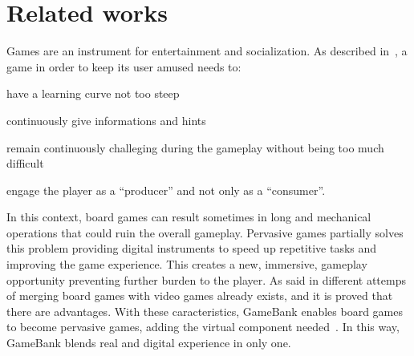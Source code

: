 \section{Related works}

Games are an instrument for entertainment and socialization. As described 
in~\cite{gee03}, a game in order to keep its user amused needs to:
\begin{enumerate*}[label=\roman*)]
 \item have a learning curve not too steep
 \item continuously give informations and hints
 \item remain continuously challeging during the gameplay without being too much
difficult
 \item engage the player as a ``producer'' and not only as a ``consumer''.
\end{enumerate*}
In this context, board games can result sometimes in long and mechanical 
operations that could ruin the overall gameplay. Pervasive games partially 
solves this problem providing digital instruments to speed up repetitive 
tasks and improving the game experience. This creates a new, immersive, 
gameplay opportunity preventing further burden to the player.
As said in\cite{mandryk02} different attemps of merging board games with video 
games already exists, and it is proved that there are advantages.
With these caracteristics, GameBank enables board games to become pervasive 
games, adding the virtual component needed~\cite{arango17}. 
In this way, GameBank blends real and digital experience in only one.

